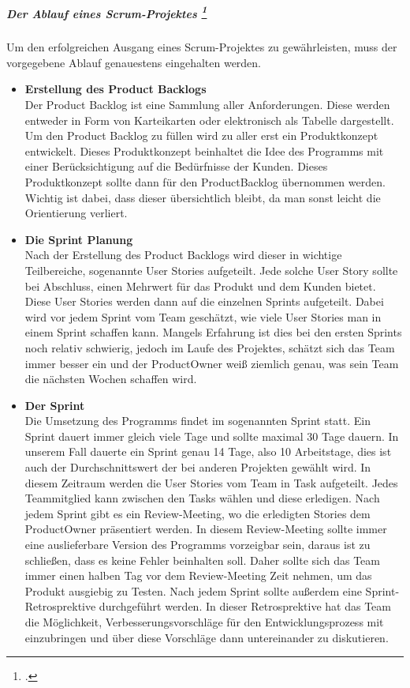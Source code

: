 \subparagraph{Der Ablauf eines Scrum-Projektes \footcite[vgl.][]{scrumprocess}}
Um den erfolgreichen Ausgang eines Scrum-Projektes zu gewährleisten, muss der vorgegebene Ablauf genauestens eingehalten werden.
\begin{itemize}
\item{\textbf{Erstellung des Product Backlogs}}\\
Der Product Backlog ist eine Sammlung aller Anforderungen. Diese werden entweder in Form von Karteikarten oder elektronisch als Tabelle dargestellt. Um den Product Backlog zu füllen wird zu aller erst ein Produktkonzept entwickelt. Dieses Produktkonzept beinhaltet die Idee des Programms mit einer Berücksichtigung auf die Bedürfnisse der Kunden. Dieses Produktkonzept sollte dann für den ProductBacklog übernommen werden. Wichtig ist dabei, dass dieser übersichtlich bleibt, da man sonst leicht die Orientierung verliert.


\item{\textbf{Die Sprint Planung}}\\
Nach der Erstellung des Product Backlogs wird dieser in wichtige Teilbereiche, sogenannte User Stories aufgeteilt. Jede solche User Story sollte bei Abschluss, einen Mehrwert für das Produkt und dem Kunden bietet. Diese User Stories werden dann auf die einzelnen Sprints aufgeteilt. Dabei wird vor jedem Sprint vom Team geschätzt, wie viele User Stories man in einem Sprint schaffen kann. Mangels Erfahrung ist dies bei den ersten Sprints noch relativ schwierig, jedoch im Laufe des Projektes, schätzt sich das Team immer besser ein und der ProductOwner weiß ziemlich genau, was sein Team die nächsten Wochen schaffen wird.
\item{\textbf{Der Sprint}}\\
Die Umsetzung des Programms findet im sogenannten Sprint statt. Ein Sprint dauert immer gleich viele Tage und sollte maximal 30 Tage dauern. In unserem Fall dauerte ein Sprint genau 14 Tage, also 10 Arbeitstage, dies ist auch der Durchschnittswert der bei anderen Projekten gewählt wird. In diesem Zeitraum werden die User Stories vom Team in Task aufgeteilt. Jedes Teammitglied kann zwischen den Tasks wählen und diese erledigen. Nach jedem Sprint gibt es ein Review-Meeting, wo die erledigten Stories dem ProductOwner präsentiert werden. In diesem Review-Meeting sollte immer eine auslieferbare Version des Programms vorzeigbar sein, daraus ist zu schließen, dass es keine Fehler beinhalten soll. Daher sollte sich das Team immer einen halben Tag vor dem Review-Meeting Zeit nehmen, um das Produkt ausgiebig zu Testen. 
Nach jedem Sprint sollte außerdem eine Sprint-Retrosprektive durchgeführt werden. In dieser Retrosprektive hat das Team die Möglichkeit, Verbesserungsvorschläge für den Entwicklungsprozess mit einzubringen und über diese Vorschläge dann untereinander zu diskutieren. 




\end{itemize}
